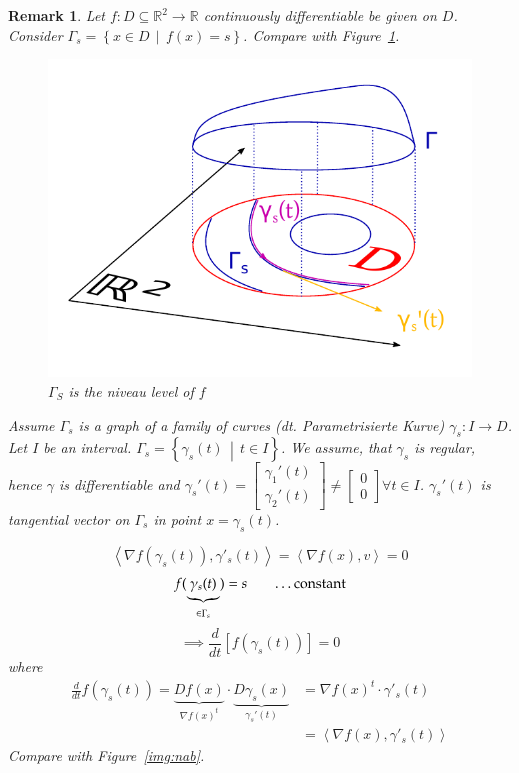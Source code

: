 \documentclass{article}
\newtheorem{remark}{Remark}  \numberwithin{remark}{section}
\newcommand{\setdef}[2]{\left\{\left.#1\,\middle|\,#2\right.\right\}}
\newcommand{\angel}[1]{\left\langle#1\right\rangle}
\begin{document}
\begin{remark}
  Let $f: D \subseteq \mathbb R^2 \to \mathbb R$ continuously differentiable be given on $D$.
  Consider $\Gamma_s = \setdef{x \in D}{f(x) = s}$. Compare with Figure~\ref{img:niveau}.

  \begin{figure}[!h]
    \begin{center}
      \includegraphics[width=.7\textwidth]{img/32_niveau.pdf}
      \caption{$\Gamma_S$ is the niveau level of $f$}
      \label{img:niveau}
    \end{center}
  \end{figure}

  Assume $\Gamma_s$ is a graph of a family of curves (dt. \foreignlanguage{german}{Parametrisierte Kurve}) $\gamma_s: I \to D$.
  Let $I$ be an interval. $\Gamma_s = \setdef{\gamma_s(t)}{t \in I}$. We assume, that $\gamma_s$ is regular, hence $\gamma$ is differentiable
  and $\gamma_s'(t) = \begin{bmatrix} \gamma_1'(t) \\ \gamma_2'(t) \end{bmatrix} \neq \begin{bmatrix} 0 \\ 0 \end{bmatrix} \forall t \in I$.
  $\gamma_s'(t)$ is tangential vector on $\Gamma_s$ in point $x = \gamma_s(t)$.

  \[ \angel{\nabla f(\gamma_s(t)), \gamma'_s(t)} = \angel{\nabla f(x), v} = 0 \]
  \[ f(\underbrace{\gamma_s(t)}_{\in \Gamma_s}) = s \qquad \text{\dots constant} \]
  \[ \implies \frac{d}{dt} [f(\gamma_s(t))] = 0  \]
  where
  \begin{align*}
    \frac{d}{dt} f(\gamma_s(t))
      = \underbrace{D f(x)}_{\nabla f(x)^t} \cdot \underbrace{D \gamma_s(x)}_{\gamma_s'(t)}
      &= \nabla f(x)^t \cdot \gamma'_s(t) \\
      &= \angel{\nabla f(x), \gamma'_s(t)}
  \end{align*}
  Compare with Figure~\ref{img:nab}.


\end{remark}
\end{document}
